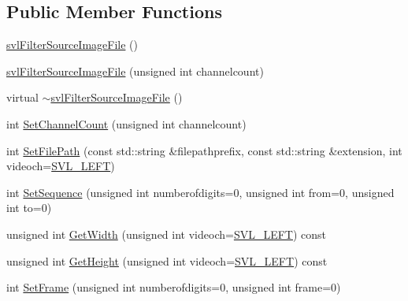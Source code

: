 \subsection*{Public Member Functions}
\begin{DoxyCompactItemize}
\item 
\hyperlink{classsvl_filter_source_image_file_a6f07ade4e9be00f15d76ddb7a671d0a5}{svl\+Filter\+Source\+Image\+File} ()
\item 
\hyperlink{classsvl_filter_source_image_file_a9663242d224bcdbbadb87cfe04b5af30}{svl\+Filter\+Source\+Image\+File} (unsigned int channelcount)
\item 
virtual \hyperlink{classsvl_filter_source_image_file_af9dd27aaf64de31638a166ca525170b9}{$\sim$svl\+Filter\+Source\+Image\+File} ()
\item 
int \hyperlink{classsvl_filter_source_image_file_a4e199aa56ce6416ef8b5a0b0110a091c}{Set\+Channel\+Count} (unsigned int channelcount)
\item 
int \hyperlink{classsvl_filter_source_image_file_a802c3c4e4164706d9625ab77c86db815}{Set\+File\+Path} (const std\+::string \&filepathprefix, const std\+::string \&extension, int videoch=\hyperlink{svl_definitions_8h_ab9fec7615f19c8df2919eebcab0b187f}{S\+V\+L\+\_\+\+L\+E\+F\+T})
\item 
int \hyperlink{classsvl_filter_source_image_file_a2d704205e8e9f15ff95b48daed38f4fb}{Set\+Sequence} (unsigned int numberofdigits=0, unsigned int from=0, unsigned int to=0)
\item 
unsigned int \hyperlink{classsvl_filter_source_image_file_ac30b1779d2dfa79b3d58509473dead79}{Get\+Width} (unsigned int videoch=\hyperlink{svl_definitions_8h_ab9fec7615f19c8df2919eebcab0b187f}{S\+V\+L\+\_\+\+L\+E\+F\+T}) const 
\item 
unsigned int \hyperlink{classsvl_filter_source_image_file_a2c0a9c7f7746ad6a481dbdff47697795}{Get\+Height} (unsigned int videoch=\hyperlink{svl_definitions_8h_ab9fec7615f19c8df2919eebcab0b187f}{S\+V\+L\+\_\+\+L\+E\+F\+T}) const 
\item 
int \hyperlink{classsvl_filter_source_image_file_ae929ec5b37f5ce33fd7811e733c651f8}{Set\+Frame} (unsigned int numberofdigits=0, unsigned int frame=0)
\end{DoxyCompactItemize}
